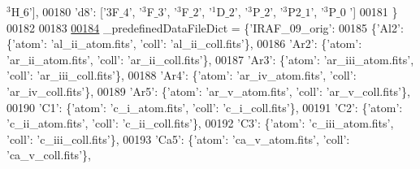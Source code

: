 \begin{DoxyCode}
{      $^3$H$\_6$'}], 
00180             \textcolor{stringliteral}{'d8'}: [\textcolor{stringliteral}{'$3$F$\_4$'}, \textcolor{stringliteral}{'$^3$F$\_3$'}, \textcolor{stringliteral}{'$^3$F$\_2$'}, \textcolor{stringliteral}{'$^1$D$\_2$'}, \textcolor{stringliteral}{'$^3$P$\_2$'}, \textcolor{stringliteral}{'$^3$P2$\_1$'}, \textcolor{stringliteral}{'$^3$P$\_0$
      '}]
00181             \}
00182 
00183 
\hypertarget{physics_8py_source_l00184}{}\hyperlink{namespacepyneb_1_1utils_1_1physics_a07a026669fde4152bdb02f243cc4f4d4}{00184} \_predefinedDataFileDict = \{\textcolor{stringliteral}{'IRAF\_09\_orig'}:
00185                            \{\textcolor{stringliteral}{'Al2'}: \{\textcolor{stringliteral}{'atom'}: \textcolor{stringliteral}{'al\_ii\_atom.fits'}, \textcolor{stringliteral}{'coll'}: \textcolor{stringliteral}{'al\_ii\_coll.fits'}\},
00186                             \textcolor{stringliteral}{'Ar2'}: \{\textcolor{stringliteral}{'atom'}: \textcolor{stringliteral}{'ar\_ii\_atom.fits'}, \textcolor{stringliteral}{'coll'}: \textcolor{stringliteral}{'ar\_ii\_coll.fits'}\},
00187                             \textcolor{stringliteral}{'Ar3'}: \{\textcolor{stringliteral}{'atom'}: \textcolor{stringliteral}{'ar\_iii\_atom.fits'}, \textcolor{stringliteral}{'coll'}: \textcolor{stringliteral}{'ar\_iii\_coll.fits'}\},
00188                             \textcolor{stringliteral}{'Ar4'}: \{\textcolor{stringliteral}{'atom'}: \textcolor{stringliteral}{'ar\_iv\_atom.fits'}, \textcolor{stringliteral}{'coll'}: \textcolor{stringliteral}{'ar\_iv\_coll.fits'}\},
00189                             \textcolor{stringliteral}{'Ar5'}: \{\textcolor{stringliteral}{'atom'}: \textcolor{stringliteral}{'ar\_v\_atom.fits'}, \textcolor{stringliteral}{'coll'}: \textcolor{stringliteral}{'ar\_v\_coll.fits'}\},
00190                             \textcolor{stringliteral}{'C1'}: \{\textcolor{stringliteral}{'atom'}: \textcolor{stringliteral}{'c\_i\_atom.fits'}, \textcolor{stringliteral}{'coll'}: \textcolor{stringliteral}{'c\_i\_coll.fits'}\},
00191                             \textcolor{stringliteral}{'C2'}: \{\textcolor{stringliteral}{'atom'}: \textcolor{stringliteral}{'c\_ii\_atom.fits'}, \textcolor{stringliteral}{'coll'}: \textcolor{stringliteral}{'c\_ii\_coll.fits'}\},
00192                             \textcolor{stringliteral}{'C3'}: \{\textcolor{stringliteral}{'atom'}: \textcolor{stringliteral}{'c\_iii\_atom.fits'}, \textcolor{stringliteral}{'coll'}: \textcolor{stringliteral}{'c\_iii\_coll.fits'}\},
00193                             \textcolor{stringliteral}{'Ca5'}: \{\textcolor{stringliteral}{'atom'}: \textcolor{stringliteral}{'ca\_v\_atom.fits'}, \textcolor{stringliteral}{'coll'}: \textcolor{stringliteral}{'ca\_v\_coll.fits'}\},

\end{DoxyCode}
